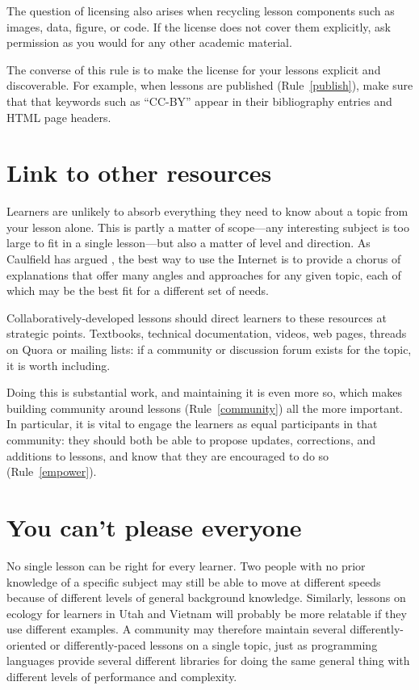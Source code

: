 \documentclass[10pt,letterpaper]{article}
\newcommand{\rulemajor}[2]{\section{#1}\label{#2}}
\newcommand{\ruleref}[1]{Rule~\ref{#1}}
\begin{document}
The question of licensing also arises when recycling lesson components
such as images, data, figure, or code.
If the license does not cover them explicitly,
ask permission as you would for any other academic material.

The converse of this rule is to make the license for your lessons explicit and discoverable.
For example,
when lessons are published (\ruleref{publish}),
make sure that that keywords such as ``CC-BY'' appear in their bibliography entries
and HTML page headers.

\rulemajor{Link to other resources}{link}

Learners are unlikely to absorb everything they need to know about a topic from your lesson alone.
This is partly a matter of scope---any interesting subject is too large
to fit in a single lesson---but also a matter of level and direction.
As Caulfield has argued \cite{choral-explanations},
the best way to use the Internet is to provide a chorus of explanations
that offer many angles and approaches for any given topic,
each of which may be the best fit for a different set of needs.

Collaboratively-developed lessons should direct learners to these resources at strategic points.
Textbooks,
technical documentation,
videos,
web pages,
threads on Quora or mailing lists:
if a community or discussion forum exists for the topic,
it is worth including.

Doing this is substantial work,
and maintaining it is even more so,
which makes building community around lessons (\ruleref{community}) all the more important.
In particular,
it is vital to engage the learners as equal participants in that community:
they should both be able to propose updates, corrections, and additions to lessons,
and know that they are encouraged to do so (\ruleref{empower}).

\rulemajor{You can't please everyone}{everyone}

No single lesson can be right for every learner.
Two people with no prior knowledge of a specific subject
may still be able to move at different speeds
because of different levels of general background knowledge.
Similarly,
lessons on ecology for learners in Utah and Vietnam
will probably be more relatable if they use different examples.
A community may therefore maintain several differently-oriented or differently-paced lessons
on a single topic,
just as programming languages provide several different libraries for doing the same general thing
with different levels of performance and complexity.
\end{document}
